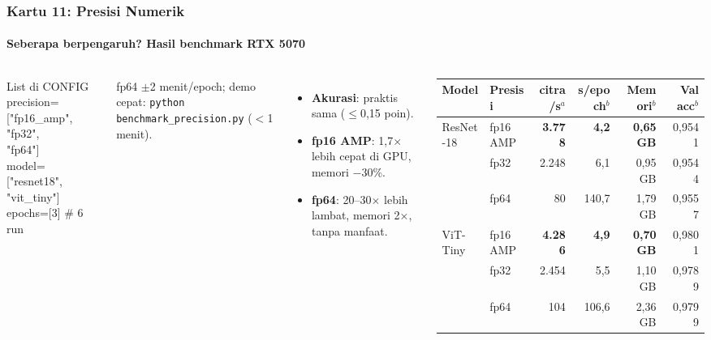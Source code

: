 \documentclass[t,aspectratio=169,xcolor={dvipsnames,table}]{beamer}
\newcommand{\con}[1]{\textcolor{dlOrange}{#1}}
\begin{document}
\begin{frame}
    \frametitle{Kartu 11: Presisi Numerik}
    \framesubtitle{Seberapa berpengaruh? Hasil benchmark RTX 5070}
    \footnotesize

    \begin{columns}[T]
        \begin{block}{List di CONFIG}
            {\ttfamily\scriptsize precision=["fp16\_amp", "fp32",\\\hspace*{5.0em}"fp64"]\\model=["resnet18", "vit\_tiny"]\\epochs=[3]   \# 6 run}
        \end{block}
        {\scriptsize fp64 $\pm$2 menit/epoch; demo cepat: \texttt{python benchmark\_precision.py} ($<$1 menit).}

        \scriptsize
        \begin{itemize}
            \item \textbf{Akurasi}: praktis sama ($\le$0,15 poin).
            \item \textbf{fp16 AMP}: 1,7$\times$ lebih cepat di GPU, memori $-$30\%.
            \item \textbf{fp64}: 20--30$\times$ lebih lambat, memori 2$\times$, \con{tanpa} manfaat.
        \end{itemize}

        \vspace{2pt}
        \scriptsize
        \setlength{\tabcolsep}{3.5pt}
        \renewcommand{\arraystretch}{1.3}
        \begin{tabular}{llrrrr}
            \toprule
            \textbf{Model} & \textbf{Presisi} & \textbf{citra/s}$^{a}$ & \textbf{s/epoch}$^{b}$ & \textbf{Memori}$^{b}$ & \textbf{Val acc}$^{b}$ \\
            \midrule
            ResNet-18 & fp16 AMP & \textbf{3.778} & \textbf{4,2} & \textbf{0,65 GB} & 0,9541 \\
                      & fp32 & 2.248 & 6,1 & 0,95 GB & 0,9544 \\
                      & fp64 & 80 & \con{140,7} & 1,79 GB & 0,9557 \\
            \midrule
            ViT-Tiny  & fp16 AMP & \textbf{4.286} & \textbf{4,9} & \textbf{0,70 GB} & 0,9801 \\
                      & fp32 & 2.454 & 5,5 & 1,10 GB & 0,9789 \\
                      & fp64 & 104 & \con{106,6} & 2,36 GB & 0,9799 \\
            \bottomrule
        \end{tabular}


\end{columns}
\end{frame}
\end{document}
